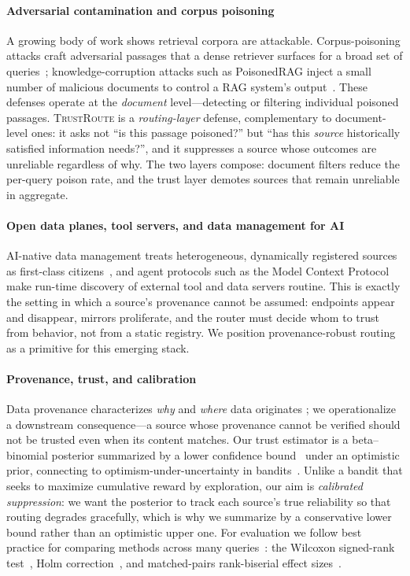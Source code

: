 \documentclass[preprint,12pt]{elsarticle}
\newcommand{\system}{\textsc{TrustRoute}}
\begin{document}
\paragraph*{Adversarial contamination and corpus poisoning}
A growing body of work shows retrieval corpora are attackable. Corpus-poisoning
attacks craft adversarial passages that a dense retriever surfaces for a broad
set of queries~\cite{zhong2023corpus}; knowledge-corruption attacks such as
PoisonedRAG inject a small number of malicious documents to control a RAG
system's output~\cite{zou2025poisonedrag}. These defenses operate at the
\emph{document} level---detecting or filtering individual poisoned passages.
\system{} is a \emph{routing-layer} defense, complementary to document-level
ones: it asks not ``is this passage poisoned?'' but ``has this \emph{source}
historically satisfied information needs?'', and it suppresses a source whose
outcomes are unreliable regardless of why. The two layers compose: document
filters reduce the per-query poison rate, and the trust layer demotes sources
that remain unreliable in aggregate.

\paragraph*{Open data planes, tool servers, and data management for AI}
AI-native data management treats heterogeneous, dynamically registered sources as
first-class citizens~\cite{ooi2024neurdb,zhou2025llmdata}, and agent protocols such
as the Model Context Protocol~\cite{anthropic2024mcp} make run-time discovery of
external tool and data servers routine. This is exactly the setting in which a
source's provenance cannot be assumed: endpoints appear and disappear, mirrors
proliferate, and the router must decide whom to trust from behavior, not from a
static registry. We position provenance-robust routing as a primitive for this
emerging stack.

\paragraph*{Provenance, trust, and calibration}
Data provenance characterizes \emph{why} and \emph{where} data originates
\cite{buneman2001why}; we operationalize a downstream consequence---a source
whose provenance cannot be verified should not be trusted even when its content
matches. Our trust estimator is a beta--binomial posterior summarized by a lower
confidence bound~\cite{wilson1927interval,brown2001interval} under an optimistic
prior, connecting to optimism-under-uncertainty in bandits~\cite{auer2002finite}.
Unlike a bandit that seeks to maximize cumulative reward by exploration, our aim
is \emph{calibrated suppression}: we want the posterior to track each source's
true reliability so that routing degrades gracefully, which is why we summarize by
a conservative lower bound rather than an optimistic upper one. For evaluation we
follow best practice for comparing methods across many
queries~\cite{demsar2006statistical}: the Wilcoxon signed-rank
test~\cite{wilcoxon1945individual}, Holm correction~\cite{holm1979simple}, and
matched-pairs rank-biserial effect sizes~\cite{cliff1993delta}.
\end{document}
